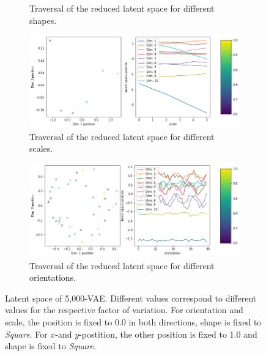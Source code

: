 \begin{figure}[H]
\begin{subfigure}{.48\textwidth}
        \caption{Traversal of the reduced latent space for different shapes.}
    \end{subfigure}
    \begin{subfigure}{.48\textwidth}
        \includegraphics[width=\textwidth]{images/latent_space_traversals/vae_5000_dsprites_latent_space_values_scale.png}
        \caption{Traversal of the reduced latent space for different scales.}
    \end{subfigure}
    \begin{subfigure}{.48\textwidth}
        \includegraphics[width=\textwidth]{images/latent_space_traversals/vae_5000_dsprites_latent_space_values_orientation.png}
        \caption{Traversal of the reduced latent space for different orientations.}
    \end{subfigure}
    \caption[5,000-VAE - Latent Space Values]{Latent space of 5,000-\ac{VAE}. Different values correspond to different values for the respective factor of variation. For orientation and scale, the position is fixed to 0.0 in both directions, shape is fixed to \textit{Square}. For $x$-and $y$-postition, the other position is fixed to 1.0 and shape is fixed to \textit{Square}.}
    \label{fig:vae_dsprite_5000_latent_space_position}
\end{figure}


